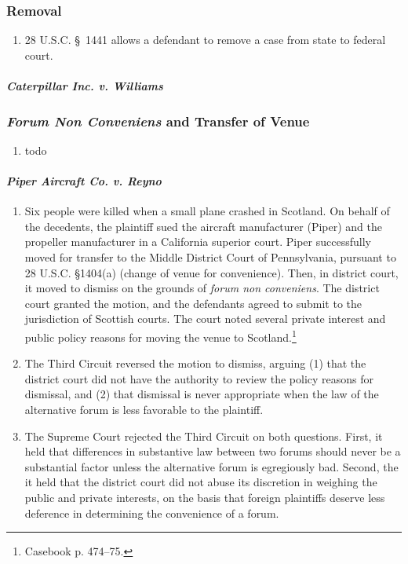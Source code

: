 \subsubsection{Removal}

\begin{enumerate}
    \item 28 U.S.C. \S\ 1441 allows a defendant to remove a case from state to federal court. %
\end{enumerate}

\paragraph{\emph{Caterpillar Inc. v. Williams}} %

\subsubsection{\emph{Forum Non Conveniens} and Transfer of Venue}

\begin{enumerate}
    \item todo
\end{enumerate}

\paragraph{\emph{Piper Aircraft Co. v. Reyno}} %

\begin{enumerate}
    \item Six people were killed when a small plane crashed in Scotland. On behalf of the decedents, the plaintiff sued the aircraft manufacturer (Piper) and the propeller manufacturer in a California superior court. Piper successfully moved for transfer to the Middle District Court of Pennsylvania, pursuant to 28 U.S.C. §1404(a) (change of venue for convenience). Then, in district court, it moved to dismiss on the grounds of \emph{forum non conveniens}. The district court granted the motion, and the defendants agreed to submit to the jurisdiction of Scottish courts. The court noted several private interest and public policy reasons for moving the venue to Scotland.\footnote{Casebook p. 474--75. }
    \item The Third Circuit reversed the motion to dismiss, arguing (1) that the district court did not have the authority to review the policy reasons for dismissal, and (2) that dismissal is never appropriate when the law of the alternative forum is less favorable to the plaintiff.
    \item The Supreme Court rejected the Third Circuit on both questions. First, it held that differences in substantive law between two forums should never be a substantial factor unless the alternative forum is egregiously bad. Second, the it held that the district court did not abuse its discretion in weighing the public and private interests, on the basis that foreign plaintiffs deserve less deference in determining the convenience of a forum.
\end{enumerate}
